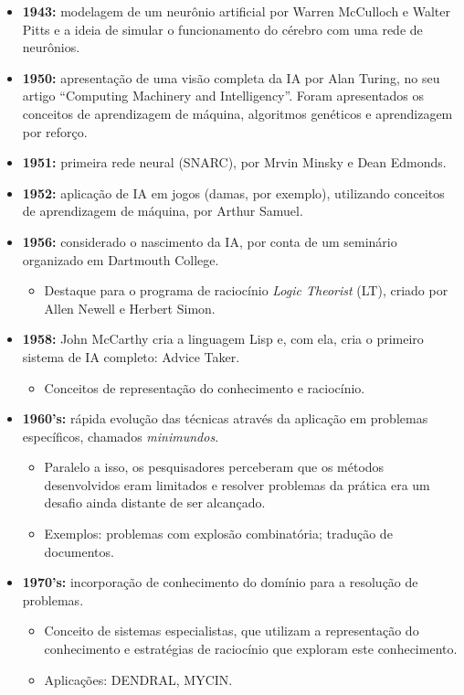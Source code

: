 \begin{itemize}
	\item \textbf{1943:} modelagem de um neurônio artificial por Warren McCulloch e Walter Pitts e a ideia de simular o funcionamento do cérebro com uma rede de neurônios.
	
	\item \textbf{1950:} apresentação de uma visão completa da IA por Alan Turing, no seu artigo ``Computing Machinery and Intelligency''. Foram apresentados os conceitos de aprendizagem de máquina, algoritmos genéticos e aprendizagem por reforço.

	\item \textbf{1951:} primeira rede neural (SNARC), por Mrvin Minsky e Dean Edmonds.
	
	\item \textbf{1952:} aplicação de IA em jogos (damas, por exemplo), utilizando conceitos de aprendizagem de máquina, por Arthur Samuel.
	
	\item \textbf{1956:} considerado o nascimento da IA, por conta de um seminário organizado em Dartmouth College.
	\begin{itemize}
		\item Destaque para o programa de raciocínio \textit{Logic Theorist} (LT), criado por Allen Newell e Herbert Simon.
	\end{itemize}
	
	\item \textbf{1958:} John McCarthy cria a linguagem Lisp e, com ela, cria o primeiro sistema de IA completo: Advice Taker.
	\begin{itemize}
		\item Conceitos de representação do conhecimento e raciocínio.
	\end{itemize}
	
	\item \textbf{1960's:} rápida evolução das técnicas através da aplicação em problemas específicos, chamados \textit{minimundos}.
	\begin{itemize}
		\item Paralelo a isso, os pesquisadores perceberam que os métodos desenvolvidos eram limitados e resolver problemas da prática era um desafio ainda distante de ser alcançado.
		\item Exemplos: problemas com explosão combinatória; tradução de documentos.
	\end{itemize}
	
	\item \textbf{1970's:} incorporação de conhecimento do domínio para a resolução de problemas.
	\begin{itemize}
		\item Conceito de sistemas especialistas, que utilizam a representação do conhecimento e estratégias de raciocínio que exploram este conhecimento.
		\item Aplicações: DENDRAL, MYCIN.
	\end{itemize}
	

\end{itemize}

